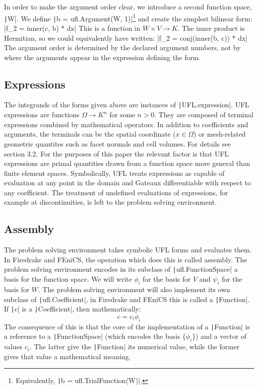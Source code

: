 \documentclass[a4paper,11pt]{article}
\begin{document}
In order to make the argument order clear, we introduce a second function space, \texttt|W|. We  define \texttt|b = ufl.Argument(W, 1)|\footnote{Equivalently, \texttt|b = ufl.TrialFunction(W)|.} and create the simplest bilinear form:
|f_2 = inner(c, b) * dx|
This is a function in $W\times V\rightarrow K$. The inner product is Hermitian, so we could equivalently have written:
|f_2 = conj(inner(b, c)) * dx|
The argument order is determined by the declared argument numbers, not by where the arguments appear in the expression defining the form.

\subsection{Expressions}

The integrands of the forms given above are instances of \texttt|UFL.expression|. UFL expressions are functions $\Omega\rightarrow K^n$ for some $n>0$. They are composed of terminal expressions combined by mathematical operators. In addition to coefficients and arguments, the terminals can be the spatial coordinate ($x\in\Omega$) or mesh-related geometric quantites such as facet normals and cell volumes. For details see \textcite{alnaes2014} section 3.2. For the purposes of this paper the relevant factor is that UFL expressions are primal quantities drawn from a function space more general than finite element spaces. Symbolically, UFL treats expressions as capable of evaluation at any point in the domain and Gateaux differentiable with respect to any coefficient. The treatment of undefined evaluations of expressions, for example at discontinuities, is left to the problem solving environment.

\subsection{Assembly}

The problem solving environment takes symbolic UFL forms and evaluates them. In Firedrake and FEniCS, the operation which does this is called assembly. The problem solving environment encodes in its subclass of
\texttt|ufl.FunctionSpace| a basis for the function space. We will write ${\phi_i}$ for the basis for $V$ and ${\psi_i}$ for the basis for $W$. The problem solving environment will also implement its own subclass of \texttt|ufl.Coefficient|, in Firedrake and FEniCS this is called a \texttt|Function|. If \texttt|c| is a \texttt|Coefficient|, then mathematically:
\begin{equation}
    c = c_i\phi_i
\end{equation}
The consequence of this is that the core of the implementation of a \texttt|Function| is a reference to a \texttt|FunctionSpace| (which encodes the basis $\{\phi_i\}$) and a vector of values $c_i$. The latter give the \texttt|Function| its numerical value, while the former gives that value a mathematical meaning.
\end{document}
